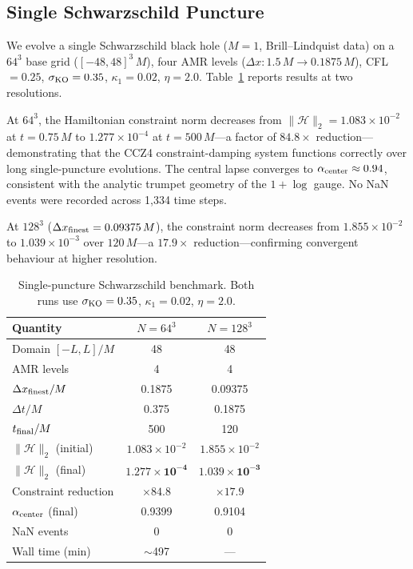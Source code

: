 \documentclass[aps,prd,twocolumn,superscriptaddress,nofootinbib,showpacs,
               longbibliography]{revtex4-2}
\newcommand{\norm}[1]{\|#1\|}
\begin{document}
\subsection{Single Schwarzschild Puncture}
\label{sec:sp_bench}

We evolve a single Schwarzschild black hole ($M = 1$, Brill--Lindquist data)
on a $64^3$ base grid ($[-48, 48]^3\,M$), four AMR levels
($\Delta x: 1.5\,M \to 0.1875\,M$), CFL $= 0.25$, $\sigma_{\rm KO} = 0.35$,
$\kappa_1 = 0.02$, $\eta = 2.0$.
Table~\ref{tab:sp} reports results at two resolutions.

At $64^3$, the Hamiltonian constraint norm decreases from
$\norm{\mathcal{H}}_2 = 1.083\times10^{-2}$ at $t = 0.75\,M$ to
$1.277\times10^{-4}$ at $t = 500\,M$---a factor of $\mathbf{84.8\times}$
reduction---demonstrating that the CCZ4 constraint-damping system functions
correctly over long single-puncture evolutions.
The central lapse converges to $\alpha_{\rm center} \approx 0.94$,
consistent with the analytic trumpet geometry of the $1+\log$ gauge.
No NaN events were recorded across 1{,}334 time steps.

At $128^3$ ($\Delta x_{\rm finest} = 0.09375\,M$), the constraint norm
decreases from $1.855\times10^{-2}$ to $1.039\times10^{-3}$ over
$120\,M$---a $17.9\times$ reduction---confirming convergent behaviour at
higher resolution.

\begin{table}[t]
\caption{Single-puncture Schwarzschild benchmark.
  Both runs use $\sigma_{\rm KO} = 0.35$, $\kappa_1 = 0.02$, $\eta = 2.0$.}
\label{tab:sp}
\begin{ruledtabular}
\begin{tabular}{lcc}
  Quantity & $N = 64^3$ & $N = 128^3$ \\ \hline
  Domain $[-L, L]/M$ & 48 & 48 \\
  AMR levels & 4 & 4 \\
  $\Delta x_{\rm finest}/M$ & 0.1875 & 0.09375 \\
  $\Delta t/M$ & 0.375 & 0.1875 \\
  $t_{\rm final}/M$ & 500 & 120 \\
  $\norm{\mathcal{H}}_2$ (initial) & $1.083\times10^{-2}$ & $1.855\times10^{-2}$ \\
  $\norm{\mathcal{H}}_2$ (final) & $\mathbf{1.277\times10^{-4}}$ & $\mathbf{1.039\times10^{-3}}$ \\
  Constraint reduction & $\times84.8$ & $\times17.9$ \\
  $\alpha_{\rm center}$ (final) & 0.9399 & 0.9104 \\
  NaN events & 0 & 0 \\
  Wall time (min) & $\sim$497 & --- \\
\end{tabular}
\end{ruledtabular}
\end{table}
\end{document}

